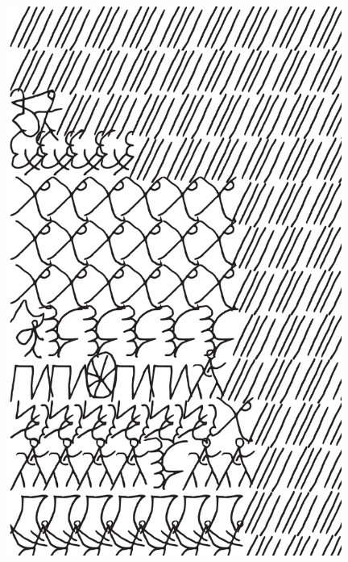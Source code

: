 \makeatletter\@openrightfalse
\movetooddpage
\begin{absolutelynopagebreak}
\begin{vplace}
\begin{figure}[H]
\begin{adjustwidth}{-0.99cm}{}
  \centering
  \vspace*{-1.77cm}
  \includegraphics[width=110mm]{./imgs/img9.pdf}  
  \hfill
\end{adjustwidth}

\thispagestyle{empty}

\end{figure}
\end{vplace}

\end{absolutelynopagebreak}

